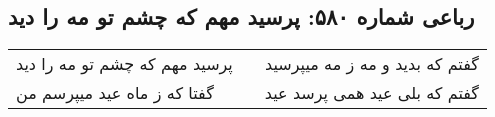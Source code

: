 \begin{center}
\section*{رباعی شماره ۵۸۰: پرسید مهم که چشم تو مه را دید}
\label{sec:0580}
\begin{longtable}{l p{0.5cm} r}
پرسید مهم که چشم تو مه را دید
&&
گفتم که بدید و مه ز مه میپرسید
\\
گفتا که ز ماه عید میپرسم من
&&
گفتم که بلی عید همی پرسد عید
\\
\end{longtable}
\end{center}
